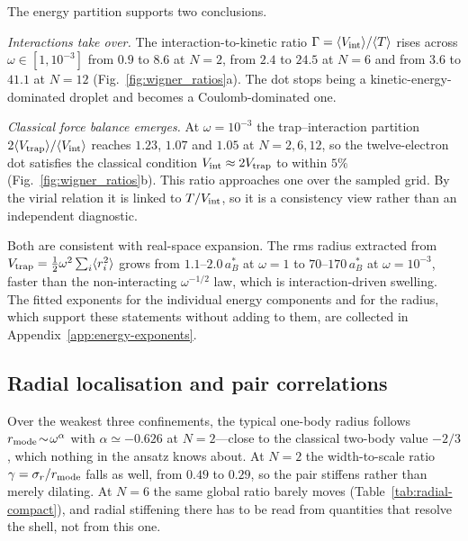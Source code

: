 The energy partition supports two conclusions.

\emph{Interactions take over.} The interaction-to-kinetic ratio
$\Gamma=\langle V_{\rm int}\rangle/\langle T\rangle$ rises across
$\omega\in[1,10^{-3}]$ from $0.9$ to $8.6$ at $N{=}2$, from $2.4$ to $24.5$ at $N{=}6$ and
from $3.6$ to $41.1$ at $N{=}12$ (Fig.~\ref{fig:wigner_ratios}a). The dot stops being a
kinetic-energy-dominated droplet and becomes a Coulomb-dominated one.

\emph{Classical force balance emerges.} At $\omega=10^{-3}$ the trap--interaction partition
$2\langle V_{\rm trap}\rangle/\langle V_{\rm int}\rangle$ reaches $1.23$, $1.07$ and $1.05$
at $N=2,6,12$, so the twelve-electron dot satisfies the classical condition
$V_{\rm int}\approx2V_{\rm trap}$ to within $5\%$ (Fig.~\ref{fig:wigner_ratios}b). This ratio
approaches one over the sampled grid. By the virial relation it is linked to
$T/V_{\rm int}$, so it is a consistency view rather than an independent diagnostic.

Both are consistent with real-space expansion. The rms radius extracted from
$V_{\rm trap}=\tfrac12\omega^2\sum_i\langle r_i^2\rangle$ grows from $1.1$--$2.0\,a_B^\ast$
at $\omega=1$ to $70$--$170\,a_B^\ast$ at $\omega=10^{-3}$, faster than the non-interacting
$\omega^{-1/2}$ law, which is interaction-driven swelling. The fitted exponents for the
individual energy components and for the radius, which support these statements without
adding to them, are collected in Appendix~\ref{app:energy-exponents}.

\subsection{Radial localisation and pair correlations}
\label{sec:wigner-radial}

Over the weakest three confinements, the typical one-body radius follows
$r_{\rm mode}\!\sim\!\omega^{\alpha}$ with $\alpha\simeq-0.626$ at $N{=}2$---close to
the classical two-body value $-2/3$, which nothing in the ansatz knows about. At $N{=}2$ the
width-to-scale ratio $\gamma=\sigma_r/r_{\rm mode}$ falls as well, from $0.49$ to $0.29$, so
the pair stiffens rather than merely dilating. At $N{=}6$ the same global ratio barely moves
(Table~\ref{tab:radial-compact}), and radial stiffening there has to be read from quantities
that resolve the shell, not from this one.

